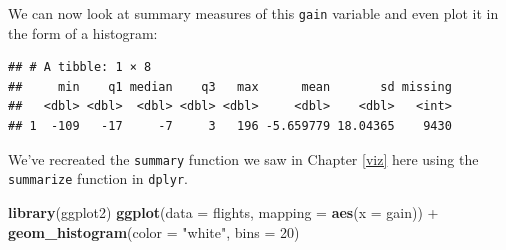 \documentclass[]{tufte-book}
\newenvironment{Shaded}{\begin{snugshade}}{\end{snugshade}}
\newcommand{\KeywordTok}[1]{\textcolor[rgb]{0.13,0.29,0.53}{\textbf{{#1}}}}
\newcommand{\DataTypeTok}[1]{\textcolor[rgb]{0.13,0.29,0.53}{{#1}}}
\newcommand{\DecValTok}[1]{\textcolor[rgb]{0.00,0.00,0.81}{{#1}}}
\newcommand{\FloatTok}[1]{\textcolor[rgb]{0.00,0.00,0.81}{{#1}}}
\newcommand{\StringTok}[1]{\textcolor[rgb]{0.31,0.60,0.02}{{#1}}}
\newcommand{\OtherTok}[1]{\textcolor[rgb]{0.56,0.35,0.01}{{#1}}}
\newcommand{\NormalTok}[1]{{#1}}
\begin{document}
We can now look at summary measures of this \texttt{gain} variable and
even plot it in the form of a histogram:

\begin{Shaded}
\end{Shaded}

\begin{verbatim}
## # A tibble: 1 × 8
##     min    q1 median    q3   max      mean       sd missing
##   <dbl> <dbl>  <dbl> <dbl> <dbl>     <dbl>    <dbl>   <int>
## 1  -109   -17     -7     3   196 -5.659779 18.04365    9430
\end{verbatim}

We've recreated the \texttt{summary} function we saw in Chapter
\ref{viz} here using the \texttt{summarize} function in \texttt{dplyr}.

\begin{Shaded}
\begin{Highlighting}[]
\KeywordTok{library}\NormalTok{(ggplot2)}
\KeywordTok{ggplot}\NormalTok{(}\DataTypeTok{data =} \NormalTok{flights, }\DataTypeTok{mapping =} \KeywordTok{aes}\NormalTok{(}\DataTypeTok{x =} \NormalTok{gain)) +}
\StringTok{  }\KeywordTok{geom_histogram}\NormalTok{(}\DataTypeTok{color =} \StringTok{"white"}\NormalTok{, }\DataTypeTok{bins =} \DecValTok{20}\NormalTok{)}
\end{Highlighting}
\end{Shaded}
\end{document}
